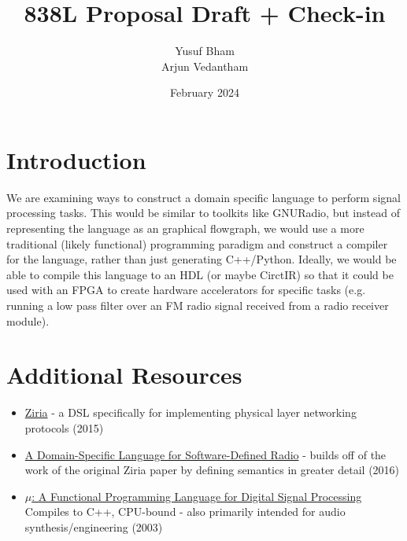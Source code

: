 \documentclass{article}
\title{838L Proposal Draft + Check-in}
\author{Yusuf Bham \\ Arjun Vedantham }
\date{February 2024}
\begin{document}
\maketitle

\section{Introduction}
We are examining ways to construct a domain specific language to perform signal processing tasks. This would be similar to toolkits like GNURadio, but instead of representing the language as an graphical flowgraph, we would use a more traditional (likely functional) programming paradigm and construct a compiler for the language, rather than just generating C++/Python. Ideally, we would be able to compile this language to an HDL (or maybe CirctIR) so that it could be used with an FPGA to create hardware accelerators for specific tasks (e.g. running a low pass filter over an FM radio signal received from a radio receiver module). 

\section{Additional Resources}
\begin{itemize}
    \item \href{https://www.microsoft.com/en-us/research/wp-content/uploads/2016/02/ASPLOS-camera.pdf}{Ziria} - a DSL specifically for implementing physical layer networking protocols (2015)
    \item \href{https://link.springer.com/chapter/10.1007/978-3-319-51676-9_12}{A Domain-Specific Language for Software-Defined Radio} - builds off of the work of the original Ziria paper by defining semantics in greater detail (2016)
    \item \href{https://www.cs.unb.ca/tech-reports/honours-theses/Matthew.Gordon-4997.pdf}{$\mu$: A Functional Programming Language for Digital Signal Processing}
     Compiles to C++, CPU-bound - also primarily intended for audio synthesis/engineering (2003)
\end{itemize}
\end{document}
